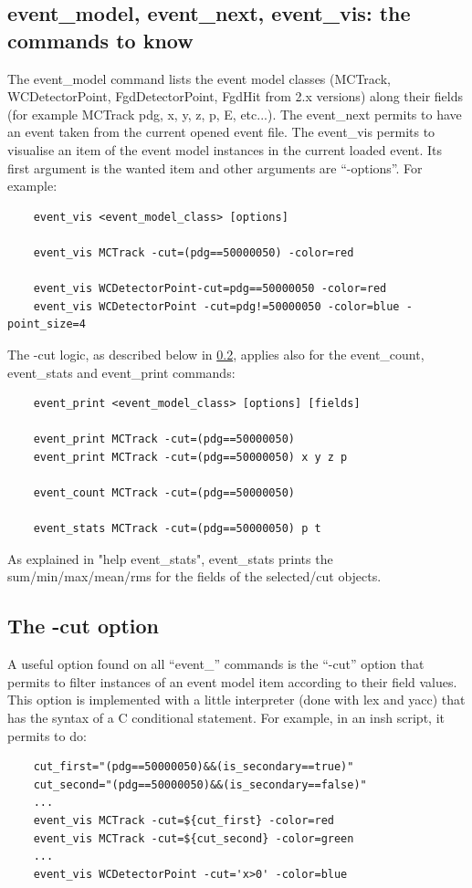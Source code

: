\documentclass{webofc}
\begin{document}
\subsection{event\_model, event\_next, event\_vis: the commands to know}
  The event\_model command lists the event model classes (MCTrack,
  WCDetectorPoint, FgdDetectorPoint, FgdHit from 2.x versions) along
 their fields (for example MCTrack pdg, x, y, z, p, E, etc...). The event\_next  permits to have an event taken from the
 current opened event file. The event\_vis permits to visualise an item of the event model
 instances in the current loaded event. Its first argument is the wanted item
 and other arguments are ``-options''. For example:
\begin{verbatim}
    event_vis <event_model_class> [options]

    event_vis MCTrack -cut=(pdg==50000050) -color=red

    event_vis WCDetectorPoint-cut=pdg==50000050 -color=red
    event_vis WCDetectorPoint -cut=pdg!=50000050 -color=blue -point_size=4
\end{verbatim}
  The -cut logic, as described below in \ref{cut}, applies also for the event\_count, event\_stats and event\_print commands:
\begin{verbatim}
    event_print <event_model_class> [options] [fields]

    event_print MCTrack -cut=(pdg==50000050)
    event_print MCTrack -cut=(pdg==50000050) x y z p

    event_count MCTrack -cut=(pdg==50000050)

    event_stats MCTrack -cut=(pdg==50000050) p t
\end{verbatim}
  As explained in "help event\_stats", event\_stats prints the
  sum/min/max/mean/rms for the fields of the selected/cut objects.

\subsection{The -cut option}
\label{cut}  
  A useful option found on all
  ``event\_'' commands  is the ``-cut'' option that permits to filter
  instances of an event model item according to their field
  values. This option is implemented with a little interpreter (done
  with lex and yacc) that has the syntax of  a C conditional statement.
  For example, in an insh script, it permits to do:
\begin{verbatim}
    cut_first="(pdg==50000050)&&(is_secondary==true)"
    cut_second="(pdg==50000050)&&(is_secondary==false)"
    ...
    event_vis MCTrack -cut=${cut_first} -color=red
    event_vis MCTrack -cut=${cut_second} -color=green
    ...
    event_vis WCDetectorPoint -cut='x>0' -color=blue
\end{verbatim}
  
\end{document}

